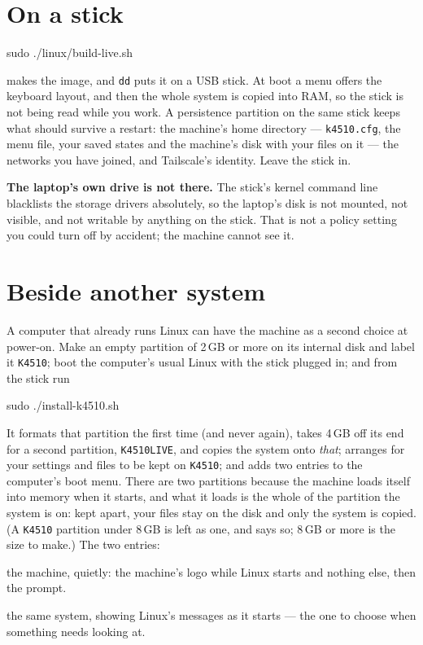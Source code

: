 \section{On a stick}
\begin{type}
sudo ./linux/build-live.sh
\end{type}

\noindent makes the image, and \texttt{dd} puts it on a USB stick. At
boot a menu offers the keyboard layout, and then the whole system is
copied into RAM, so the stick is not being read while you work. A
persistence partition on the same stick keeps what should survive a
restart: the machine's home directory --- \texttt{k4510.cfg}, the menu
file, your saved states and the machine's disk with your files on it
--- the networks you have joined, and Tailscale's identity. Leave the
stick in.

\textbf{The laptop's own drive is not there.} The stick's kernel command
line blacklists the storage drivers absolutely, so the laptop's disk is
not mounted, not visible, and not writable by anything on the stick.
That is not a policy setting you could turn off by accident; the machine
cannot see it.

\section{Beside another system}\label{sec:install}
A computer that already runs Linux can have the machine as a second
choice at power-on. Make an empty partition of 2\,GB or more on its
internal disk and label it \texttt{K4510}; boot the computer's usual
Linux with the stick plugged in; and from the stick run

\begin{type}
sudo ./install-k4510.sh
\end{type}

\noindent It formats that partition the first time (and never again),
takes 4\,GB off its end for a second partition, \texttt{K4510LIVE}, and
copies the system onto \emph{that}; arranges for your settings and files
to be kept on \texttt{K4510}; and adds two entries to the computer's boot
menu. There are two partitions because the machine loads itself into
memory when it starts, and what it loads is the whole of the partition
the system is on: kept apart, your files stay on the disk and only the
system is copied. (A \texttt{K4510} partition under 8\,GB is left as one,
and says so; 8\,GB or more is the size to make.) The two entries:

\begin{description}[leftmargin=1.4em,style=nextline]
\item[K4510 Fantasy Computer] the machine, quietly: the machine's logo
  while Linux starts and nothing else, then the prompt.
\item[K4510 (text boot)] the same system, showing Linux's messages as
  it starts --- the one to choose when something needs looking at.
\end{description}

